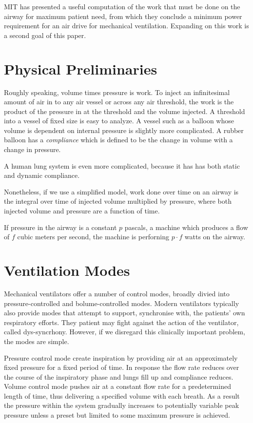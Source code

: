 \documentclass[conference]{article}
\begin{document}
MIT has presented a useful computation of the work that must be done
on the airway for maximum patient need, from which they conclude a
minimum power requirement for an air drive for
mechanical ventilation\cite{mitpowercalculation}. Expanding on
this work is a second goal of this paper.


\section{Physical Preliminaries}

Roughly speaking, volume times pressure is work.
To inject an infinitesimal amount of air in
to any air vessel or across any air threshold,
the work is the product of the pressure in at the threshold and the
volume injected.
A threshold into a vessel of fixed size is easy to analyze.
A vessel such as a balloon whose volume is dependent on internal pressure
is slightly more complicated.
A rubber balloon has a {\em compliance} which is defined to be
the change in volume with a change in pressure.

A human lung system is even more
complicated, because it has has
both static and dynamic compliance\cite{west2012respiratory}.

Nonetheless, if we use a simplified model, work done over time
on an airway is the integral over time of injected volume
multiplied by pressure, where both injected volume and
pressure are a function of time.

If pressure in the airway is a constant $p$ pascals, a machine which produces a flow of $f$ cubic meters
per second, the machine is perforning $p \cdot f$ watts on the airway.


\section{Ventilation Modes}

Mechanical ventilators offer a number of control modes,
broadly divied into pressure-controlled and bolume-controlled modes.
Modern ventilators typically also provide modes that attempt to support, synchronise with, the patients' own respiratory efforts.
They patient may fight against the action of the ventilator,
called dys-syncrhony. However, if we disregard this clinically
important problem, the modes are simple.

Pressure control mode create inspiration by providing air
at an approximately fixed pressure for a fixed period of time.
In response the flow rate reduces over the course of the inspiratory
phase and lungs fill up and compliance reduces.
Volume control mode pushes air at a constant flow rate for a predetermined length
of time, thus delivering a specified volume with each breath.
As a result the pressure within the system gradually increases to potentially
variable peak pressure unless a preset but limited to some maximum pressure is achieved.
\end{document}
